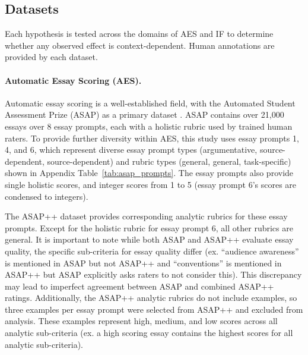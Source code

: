 \subsection{Datasets}
\label{sec:datasets}

Each hypothesis is tested across the domains of AES and IF to determine whether any observed effect is context-dependent. Human annotations are provided by each dataset.

\paragraph{Automatic Essay Scoring (AES).} Automatic essay scoring is a well-established field, with the Automated Student Assessment Prize (ASAP) as a primary dataset \citep{asap-aes}. ASAP contains over 21,000 essays over 8 essay prompts, each with a holistic rubric used by trained human raters. To provide further diversity within AES, this study uses essay prompts 1, 4, and 6, which represent diverse essay prompt types (argumentative, source-dependent, source-dependent) and rubric types (general, general, task-specific) shown in Appendix Table~\ref{tab:asap_prompts}. The essay prompts also provide single holistic scores, and integer scores from 1 to 5 (essay prompt 6's scores are condensed to integers). 

The ASAP++ dataset \citep{mathias-bhattacharyya-2018-asap} provides corresponding analytic rubrics for these essay prompts. Except for the holistic rubric for essay prompt 6, all other rubrics are general. It is important to note while both ASAP and ASAP++ evaluate essay quality, the specific sub-criteria for essay quality differ (ex. ``audience awareness'' is mentioned in ASAP but not ASAP++ and ``conventions'' is mentioned in ASAP++ but ASAP explicitly asks raters to not consider this). This discrepancy may lead to imperfect agreement between ASAP and combined ASAP++ ratings. Additionally, the ASAP++ analytic rubrics do not include examples, so three examples per essay prompt were selected from ASAP++ and excluded from analysis. These examples represent high, medium, and low scores across all analytic sub-criteria (ex. a high scoring essay contains the highest scores for all analytic sub-criteria).



